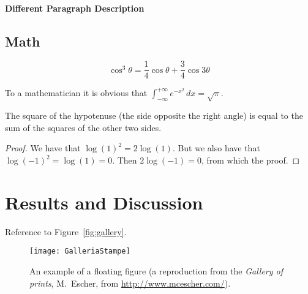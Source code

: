 \documentclass[
12pt, %
a4paper, %
oneside, %
headinclude,footinclude, %
BCOR5mm, %
]{scrartcl}
\begin{document}
\paragraph{Different Paragraph Description} \lipsum[8] %


\subsection{Math}

\lipsum[4] %

\begin{equation}
\cos^3 \theta =\frac{1}{4}\cos\theta+\frac{3}{4}\cos 3\theta
\label{eq:refname2}
\end{equation}

\lipsum[5] %

\begin{definition}[Gauss] 
To a mathematician it is obvious that
$\int_{-\infty}^{+\infty}
e^{-x^2}\,dx=\sqrt{\pi}$. 
\end{definition} 

\begin{theorem}[Pythagoras]
The square of the hypotenuse (the side opposite the right angle) is equal to the sum of the squares of the other two sides.
\end{theorem}

\begin{proof} 
We have that $\log(1)^2 = 2\log(1)$.
But we also have that $\log(-1)^2=\log(1)=0$.
Then $2\log(-1)=0$, from which the proof.
\end{proof}


\section{Results and Discussion}

Reference to Figure~\vref{fig:gallery}. %

\begin{figure}[tb]
\centering 
\texttt{[image: GalleriaStampe]} 
\caption[An example of a floating figure]{An example of a floating figure (a reproduction from the \emph{Gallery of prints}, M.~Escher, from \url{http://www.mcescher.com/}).} %
\label{fig:gallery} 
\end{figure}
\end{document}
